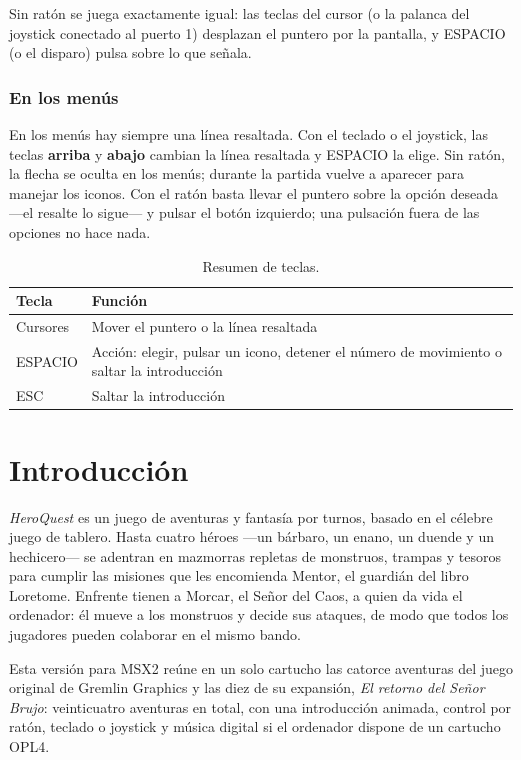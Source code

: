 Sin ratón se juega exactamente igual: las teclas del cursor (o la palanca
del joystick conectado al puerto 1) desplazan el puntero por la pantalla, y
ESPACIO (o el disparo) pulsa sobre lo que señala.

\subsection{En los menús}

En los menús hay siempre una línea resaltada. Con el teclado o el joystick,
las teclas \textbf{arriba} y \textbf{abajo} cambian la línea resaltada y
ESPACIO la elige. Sin ratón, la flecha se oculta en los menús; durante la partida vuelve a
aparecer para manejar los iconos. Con el ratón basta llevar el puntero sobre la opción
deseada ---el resalte lo sigue--- y pulsar el botón izquierdo; una
pulsación fuera de las opciones no hace nada.

\begin{table}[H]\centering\small
\begin{tabularx}{\linewidth}{@{}lL@{}}
\toprule
\textbf{Tecla} & \textbf{Función}\\
\midrule
Cursores & Mover el puntero o la línea resaltada\\
ESPACIO & Acción: elegir, pulsar un icono, detener el número de movimiento
          o saltar la introducción\\
ESC & Saltar la introducción\\
\bottomrule
\end{tabularx}
\caption{Resumen de teclas.}
\end{table}

\chapter{Introducción}


\textit{HeroQuest} es un juego de aventuras y fantasía por turnos, basado en
el célebre juego de tablero. Hasta cuatro héroes ---un bárbaro, un enano, un
duende y un hechicero--- se adentran en mazmorras repletas de monstruos,
trampas y tesoros para cumplir las misiones que les encomienda Mentor, el
guardián del libro Loretome. Enfrente tienen a Morcar, el Señor del Caos, a
quien da vida el ordenador: él mueve a los monstruos y decide sus ataques,
de modo que todos los jugadores pueden colaborar en el mismo bando.

Esta versión para MSX2 reúne en un solo cartucho las catorce aventuras del
juego original de Gremlin Graphics y las diez de su expansión, \textit{El
retorno del Señor Brujo}: veinticuatro aventuras en total, con una introducción animada, control por ratón, teclado o
joystick y música digital si el ordenador dispone de un cartucho OPL4.

